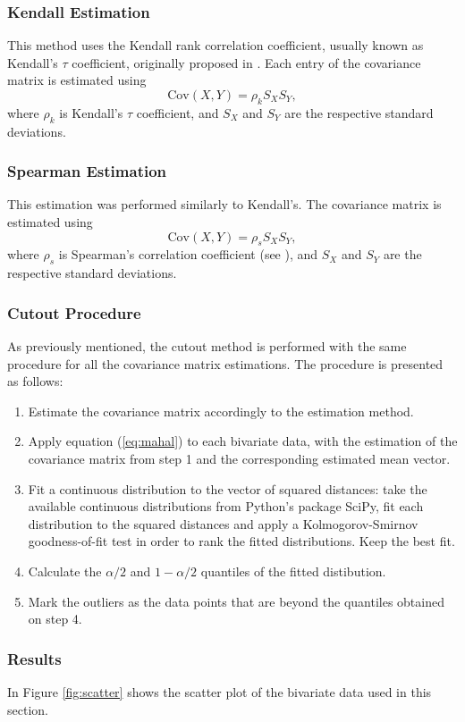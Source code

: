 \documentclass[11pt]{article}
\theoremstyle{definition}
\theoremstyle{remark}
\theoremstyle{remark}
\begin{document}
\subsubsection*{Kendall Estimation}
This method uses the Kendall rank correlation coefficient, usually
known as Kendall's $\tau$ coefficient, originally proposed in
\cite{kendall1938new}. Each entry of the covariance matrix is
estimated using
\[
  \mathrm{Cov}(X,Y)=\rho_kS_XS_Y,
\]
where $\rho_k$ is Kendall's $\tau$ coefficient, and $S_X$ and $S_Y$
are the respective standard deviations.

\subsubsection*{Spearman Estimation}
This estimation was performed similarly to Kendall's. The covariance
matrix is estimated using
\[
  \mathrm{Cov}(X,Y)=\rho_sS_XS_Y,
\]
where $\rho_s$ is Spearman's correlation coefficient (see
\cite{ce1904general}), and $S_X$ and $S_Y$ are the respective standard
deviations.

\subsubsection*{Cutout Procedure}
As previously mentioned, the cutout method is performed with the same
procedure for all the covariance matrix estimations. The procedure is
presented as follows:
\begin{enumerate}
\item Estimate the covariance matrix accordingly to the estimation
  method.
  \item Apply equation (\ref{eq:mahal}) to each bivariate data, with
    the estimation of the covariance matrix from step 1 and the
    corresponding estimated mean vector.
  \item Fit a continuous distribution to the vector of squared
    distances: take the available continuous distributions from
    Python's package SciPy, fit each distribution to the squared
    distances and apply a Kolmogorov-Smirnov goodness-of-fit test in
    order to rank the fitted distributions. Keep the best fit.
  \item Calculate the $\alpha/2$ and $1-\alpha/2$ quantiles of the fitted distibution.
  \item Mark the outliers as the data points that are beyond the
    quantiles obtained on step 4.
\end{enumerate}


\subsubsection*{Results}
In Figure \ref{fig:scatter} shows the scatter plot of the bivariate
data used in this section.
\end{document}
